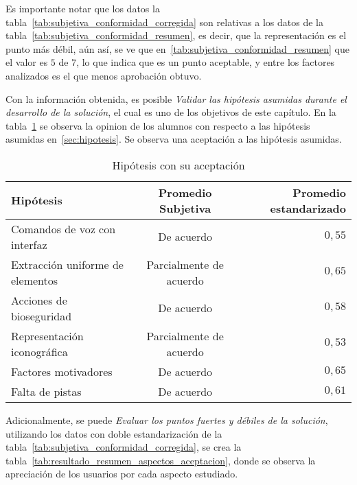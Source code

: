 Es importante notar que los datos la
tabla~\ref{tab:subjetiva_conformidad_corregida} son relativas a los datos de la
tabla~\ref{tab:subjetiva_conformidad_resumen}, es decir, que la representación
es el punto más débil, aún así, se ve que
en~\ref{tab:subjetiva_conformidad_resumen} que el valor es $5$ de $7$, lo que
indica que es un punto aceptable, y entre los factores analizados es el que
menos aprobación obtuvo.


Con la información obtenida, es posible \emph{Validar las hipótesis asumidas
    durante el desarrollo de la solución}, el cual es uno de los objetivos de
este capítulo. En la tabla~\ref{tab:resultado_resumen_hipotesis} se observa la
opinion de los alumnos con respecto a las hipótesis asumidas
en~\ref{sec:hipotesis}. Se observa una aceptación a las hipótesis asumidas.

\begin{table}[!hbt]
\centering
\begin{tabular}{lcr}
\toprule
Hipótesis                        & Promedio Subjetiva      & Promedio estandarizado \\
\midrule
Comandos de voz con interfaz     & De acuerdo              & $0,55$ \\
Extracción uniforme de elementos & Parcialmente de acuerdo & $0,65$ \\
Acciones de bioseguridad         & De acuerdo              & $0,58$ \\
Representación iconográfica      & Parcialmente de acuerdo & $0,53$ \\
Factores motivadores             & De acuerdo              & $0,65$ \\
Falta de pistas                  & De acuerdo              & $0,61$ \\
\bottomrule
\end{tabular}
\caption{Hipótesis con su aceptación}\label{tab:resultado_resumen_hipotesis}
\end{table}

Adicionalmente, se puede \emph{Evaluar los puntos fuertes y débiles de la
    solución}, utilizando los datos con doble estandarización de la
tabla~\ref{tab:subjetiva_conformidad_corregida}, se crea la
tabla~\ref{tab:resultado_resumen_aspectos_aceptacion}, donde se observa la
apreciación de los usuarios por cada aspecto estudiado.

